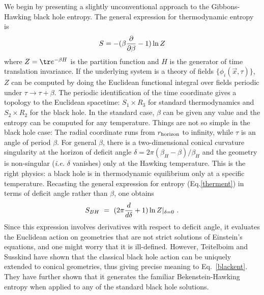\documentclass[12pt]{article}
\begin{document}
We begin by presenting a slightly unconventional approach to the
Gibbons-Hawking
black hole entropy. The general expression for thermodynamic entropy is
\begin{equation}
S = -(\beta {\partial \over \partial \beta} -1 ) \ln Z
\label{therment}
\end{equation}
where $Z = \tr e^{-\beta H}$ is the partition function and $H$ is the
generator of time translation invariance. If the underlying
system is a theory of fields $\{\phi_i(\vec x,\tau)\}$, $Z$ can be
computed by doing the Euclidean functional integral over fields
periodic under $\tau\to\tau+\beta$. The periodic identification of the time
coordinate gives a topology to the Euclidean spacetime: $S_1\times R_3$ for
standard thermodynamics and $S_2\times R_2$ for the black hole. In the standard
case, $\beta$ can be given any value and the entropy can be computed for
any temperature. Things are not so simple in the black hole case: The radial
coordinate runs from $r_{\rm horizon}$ to infinity, while $\tau$ is an angle
of period $\beta$. For general $\beta$, there is a two-dimensional conical
curvature singularity at the horizon of deficit angle $\delta= 2\pi
(\beta_H-\beta)/\beta_H$
and the geometry is non-singular ({\it i.e.} $\delta$ vanishes)
only at the Hawking temperature. This is the right physics: a black hole is in
thermodynamic equilibrium only at a specific temperature. Recasting the
general expression for entropy (Eq.\ref{therment}) in terms of deficit angle
rather than $\beta$, one obtains
\begin{equation}
S_{BH}~=~ (2\pi{d \over d \delta} +1 ) \ln Z |_{\delta=0}~.
\label{blackent}
\end{equation}
Since this expression involves derivatives with respect to deficit angle, it
evaluates the Euclidean action on geometries that are not strict solutions of
Einstein's equations, and one might worry that it is ill-defined. However,
Teitelboim\cite{claudio} and Susskind\cite{lenny} have shown that the classical
black hole action can be uniquely extended to conical geometries, thus giving
precise
meaning to Eq.~\ref{blackent}. They have further shown that it generates
  the familiar Bekenstein-Hawking entropy when applied to any of the standard
black hole solutions.
\end{document}
